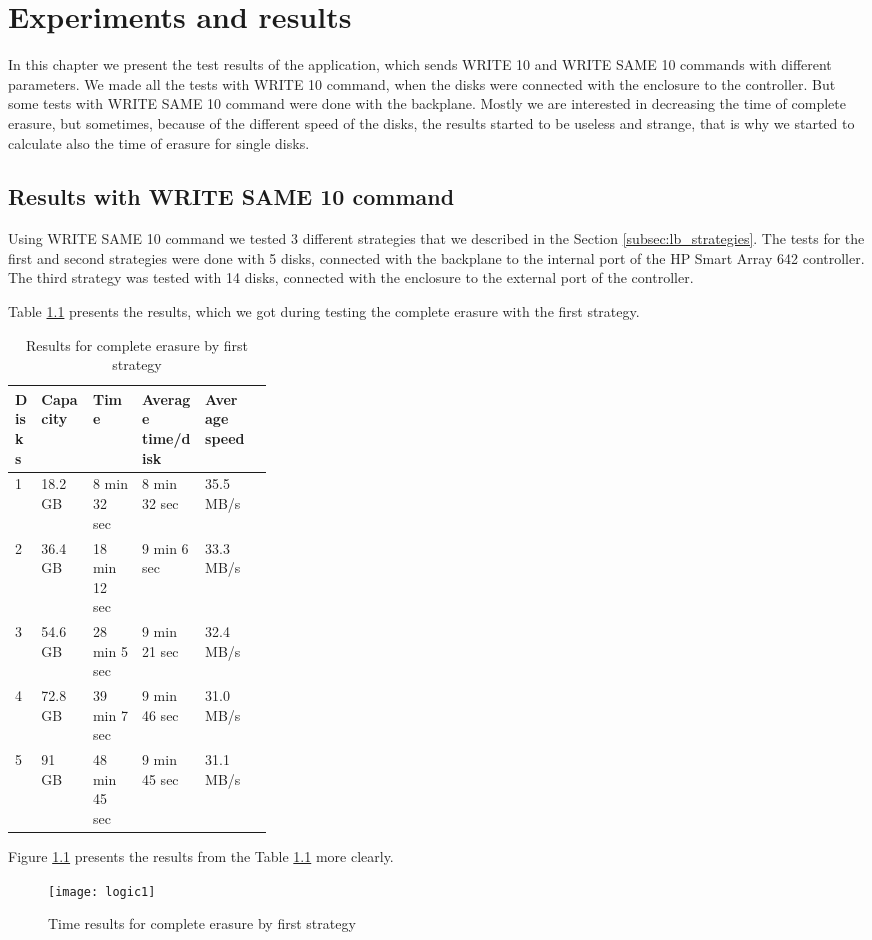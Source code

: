 \chapter{Experiments and results}
\label{chap5:title}

In this chapter we present the test results of the application, which sends WRITE 10 and WRITE SAME 10 commands with different parameters. We made all the tests with WRITE 10 command, when the disks were connected with the enclosure to the controller. But some tests with WRITE SAME 10 command were done with the backplane. Mostly we are interested in decreasing the time of complete erasure, but sometimes, because of the different speed of the disks, the results started to be useless and strange, that is why we started to calculate also the time of erasure for single disks. 

\section{Results with WRITE SAME 10 command}
Using WRITE SAME 10 command we tested 3 different strategies that we described in the Section \ref{subsec:lb_strategies}. The tests for the first and second strategies were done with 5 disks, connected with the backplane to the internal port of the HP Smart Array 642 controller. The third strategy was tested with 14 disks, connected with the enclosure to the external port of the controller. 

\newpage 
Table \ref{tbl:tbl_logic1} presents the results, which we got during testing the complete erasure with the first strategy. 

\begin{table}[h!]
  \caption{Results for complete erasure by first strategy}
  \begin{center}
  \begin{tabularx}{\textwidth}{|p{0.1\linewidth}|p{0.2\linewidth}|X|X|X|X|}
    \hline
    Disks & Capacity & Time & Average time/disk & Average speed
    \\ \hline
    1 & 18.2 GB & 8 min 32 sec  & 8 min 32 sec & 35.5 MB/s \\ \hline    
    2 & 36.4 GB & 18 min 12 sec & 9 min 6 sec  & 33.3 MB/s \\ \hline
    3 & 54.6 GB & 28 min 5 sec  & 9 min 21 sec & 32.4 MB/s \\ \hline
    4 & 72.8 GB & 39 min 7 sec  & 9 min 46 sec & 31.0 MB/s \\ \hline
    5 & 91 GB   & 48 min 45 sec & 9 min 45 sec & 31.1 MB/s \\ \hline
  \end{tabularx}
  \label{tbl:tbl_logic1}
  \end{center}
\end{table}
Figure \ref{fig:logic1} presents the results from the Table \ref{tbl:tbl_logic1} more clearly.
\begin{figure}[h!]
\begin{center}
  \texttt{[image: logic1]}
\end{center}
  \caption{Time results for complete erasure by first strategy}
  \label{fig:logic1}
\end{figure}

